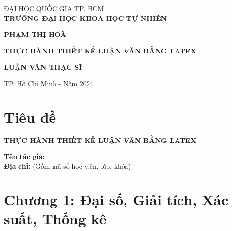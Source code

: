 \documentclass[a4paper]{book}
\begin{document}
\begin{titlepage}
    \begin{mdframed}[linewidth=3pt, linecolor=black, innerleftmargin=20pt, innerrightmargin=20pt, innertopmargin=20pt, innerbottommargin=20pt]
    \begin{center}
        \fontsize{14}{16}\selectfont
        ĐẠI HỌC QUỐC GIA TP. HCM\\
        \textbf{TRƯỜNG ĐẠI HỌC KHOA HỌC TỰ NHIÊN}
        
        \vspace{2cm}
        
        \fontsize{14}{16}\selectfont
        \textbf{PHẠM THỊ HOÀ}
        
        \vspace{1cm}
        
        \fontsize{16}{18}\selectfont
        \textbf{THỰC HÀNH THIẾT KẾ LUẬN VĂN BẰNG LATEX}
        
        \vspace{5cm}
        
        \fontsize{14}{16}\selectfont
        \textbf{LUẬN VĂN THẠC SĨ}
        
        \vspace{3cm}
        
        \fontsize{12}{14}\selectfont
        TP. Hồ Chí Minh - Năm 2024
    \end{center}
    \end{mdframed}
\end{titlepage}

\tableofcontents
\chapter*{Tiêu đề}
\begin{center}
    \Large
    \textbf{THỰC HÀNH THIẾT KẾ LUẬN VĂN BẰNG LATEX}
\end{center}

\vspace{1cm}

\begin{flushleft}
    \large
    \textbf{Tên tác giả:} \\
    \textbf{Địa chỉ:} (Gồm mã số học viên, lớp, khóa)
\end{flushleft}

\vspace{1cm}

\chapter{Chương 1: Đại số, Giải tích, Xác suất, Thống kê}
\end{document}
